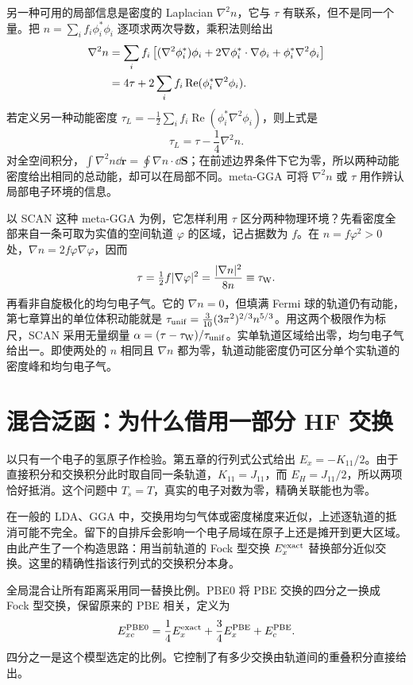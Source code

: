 另一种可用的局部信息是密度的 Laplacian $\nabla^2n$，它与 $\tau$ 有联系，但不是同一个量。把 $n=\sum_i f_i\phi_i^*\phi_i$ 逐项求两次导数，乘积法则给出
\begin{align}
\nabla^2n
&=\sum_i f_i\left[(\nabla^2\phi_i^*)\phi_i
+2\nabla\phi_i^*\cdot\nabla\phi_i+\phi_i^*\nabla^2\phi_i\right]\notag\\
&=4\tau+2\sum_i f_i\operatorname{Re}(\phi_i^*\nabla^2\phi_i).
\end{align}
若定义另一种动能密度 $\tau_L=-\tfrac12\sum_i f_i\operatorname{Re}(\phi_i^*\nabla^2\phi_i)$，则上式是
\begin{equation}
\tau_L=\tau-\frac14\nabla^2n.
\end{equation}
对全空间积分，$\int\nabla^2n\dd\bm r=\oint\nabla n\cdot\dd\bm S$；在前述边界条件下它为零，所以两种动能密度给出相同的总动能，却可以在局部不同。meta-GGA 可将 $\nabla^2n$ 或 $\tau$ 用作辨认局部电子环境的信息。

以 SCAN 这种 meta-GGA 为例，它怎样利用 $\tau$ 区分两种物理环境？先看密度全部来自一条可取为实值的空间轨道 $\varphi$ 的区域，记占据数为 $f$。在 $n=f\varphi^2>0$ 处，$\nabla n=2f\varphi\nabla\varphi$，因而
\[
 \tau=\tfrac12 f|\nabla\varphi|^2
     =\frac{|\nabla n|^2}{8n}\equiv\tau_{\rm W} .
\]
再看非自旋极化的均匀电子气。它的 $\nabla n=0$，但填满 Fermi 球的轨道仍有动能，第七章算出的单位体积动能就是 $\tau_{\rm unif}=\tfrac3{10}(3\pi^2)^{2/3}n^{5/3}$。用这两个极限作为标尺，SCAN 采用无量纲量 $\alpha=(\tau-\tau_{\rm W})/\tau_{\rm unif}$。实单轨道区域给出零，均匀电子气给出一。即使两处的 $n$ 相同且 $\nabla n$ 都为零，轨道动能密度仍可区分单个实轨道的密度峰和均匀电子气。

\section{混合泛函：为什么借用一部分 HF 交换}
以只有一个电子的氢原子作检验。第五章的行列式公式给出 $E_x=-K_{11}/2$。由于直接积分和交换积分此时取自同一条轨道，$K_{11}=J_{11}$，而 $E_H=J_{11}/2$，所以两项恰好抵消。这个问题中 $T_s=T$，真实的电子对数为零，精确关联能也为零。

在一般的 LDA、GGA 中，交换用均匀气体或密度梯度来近似，上述逐轨道的抵消可能不完全。留下的自排斥会影响一个电子局域在原子上还是摊开到更大区域。由此产生了一个构造思路：用当前轨道的 Fock 型交换 $E_x^{\rm exact}$ 替换部分近似交换。这里的精确性指该行列式的交换积分本身。

全局混合让所有距离采用同一替换比例。PBE0 将 PBE 交换的四分之一换成 Fock 型交换，保留原来的 PBE 相关，定义为
\begin{equation}
E_{xc}^{\rm PBE0}=\frac14E_x^{\rm exact}+\frac34E_x^{\rm PBE}+E_c^{\rm PBE}.
\end{equation}
四分之一是这个模型选定的比例。它控制了有多少交换由轨道间的重叠积分直接给出。

